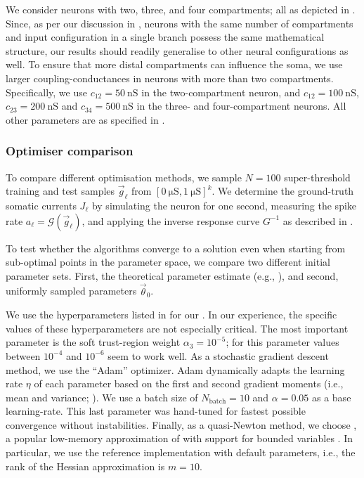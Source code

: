 We consider \nlif neurons with two, three, and four compartments; all as depicted in .
Since, as per our discussion in , \nlif neurons with the same number of compartments and input configuration in a single branch possess the same mathematical structure, our results should readily generalise to other neural configurations as well.
To ensure that more distal compartments can influence the soma, we use larger coupling-conductances in neurons with more than two compartments.
Specifically, we use $c_{12} = \SI{50}{\nano\siemens}$ in the two-compartment \LIF neuron, and $c_{12} = \SI{100}{\nano\siemens}$, $c_{23} = \SI{200}{\nano\siemens}$ and $c_{34} = \SI{500}{\nano\siemens}$ in the three- and four-compartment neurons.
All other parameters are as specified in .

\subsubsection{Optimiser comparison}
To compare different optimisation methods, we sample $N = 100$ super-threshold training and test samples $\vec g_\ell$ from $[\SI{0}{\micro\siemens}, \SI{1}{\micro\siemens}]^k$.
We determine the ground-truth somatic currents $J_\ell$ by simulating the neuron for one second, measuring the spike rate $a_\ell = \mathscr{G}(\vec g_\ell)$, and applying the inverse response curve $G^{-1}$ as described in .

To test whether the algorithms converge to a solution even when starting from sub-optimal points in the parameter space, we compare two different initial parameter sets.
First, the theoretical parameter estimate (e.g., ), and second, uniformly sampled parameters $\vec \theta_0$.

We use the hyperparameters listed in  for our \QP.
In our experience, the specific values of these hyperparameters are not especially critical.
The most important parameter is the soft trust-region weight $\alpha_3 = 10^{-5}$; for this parameter values between $10^{-4}$ and $10^{-6}$ seem to work well.
As a stochastic gradient descent method, we use the \enquote{Adam} optimizer.
Adam dynamically adapts the learning rate $\eta$ of each parameter based on the first and second gradient moments (i.e., mean and variance; \cite{kingma2015adam}).
We use a batch size of $N_\mathrm{batch} = 10$ and $\alpha = 0.05$ as a base learning-rate.
This last parameter was hand-tuned for fastest possible convergence without instabilities.
Finally, as a quasi-Newton method, we choose \LBFGSB, a popular low-memory approximation of \BFGS with support for bounded variables \citep{byrd1995limited}.
In particular, we use the \LBFGSB reference implementation with default parameters, i.e., the rank of the Hessian approximation is $m = 10$.


